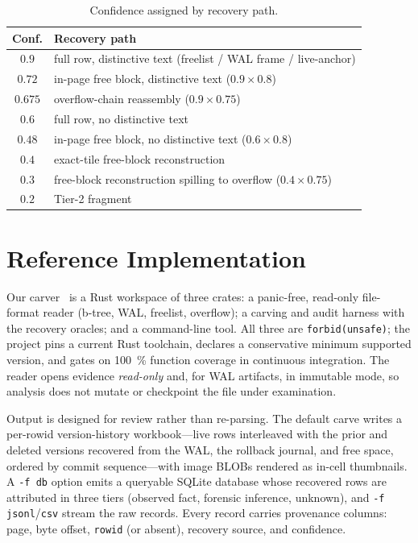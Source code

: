 \documentclass[10pt,a4paper]{article}
\newcommand{\code}[1]{\texttt{#1}}
\newcommand{\Sys}{Our carver}
\newcommand{\Sys}{\texttt{sqlite4n6}}
\begin{document}
\begin{table}[t]
\centering\small
\caption{Confidence assigned by recovery path.}
\label{tab:confidence}
\begin{tabular}{@{}c p{}@{}}
\toprule
Conf. & Recovery path \\
\midrule
$0.9$   & full row, distinctive text (freelist / WAL frame / live-anchor) \\
$0.72$  & in-page free block, distinctive text ($0.9\times0.8$) \\
$0.675$ & overflow-chain reassembly ($0.9\times0.75$) \\
$0.6$   & full row, no distinctive text \\
$0.48$  & in-page free block, no distinctive text ($0.6\times0.8$) \\
$0.4$   & exact-tile free-block reconstruction \\
$0.3$   & free-block reconstruction spilling to overflow ($0.4\times0.75$) \\
$0.2$   & Tier-2 fragment \\
\bottomrule
\end{tabular}
\end{table}

\section{Reference Implementation}\label{sec:impl}

\Sys~\cite{sqlite4n6} is a Rust workspace of three crates: a panic-free, read-only
file-format reader (b-tree, WAL, freelist, overflow); a carving and audit harness
with the recovery oracles; and a command-line tool. All three are
\code{forbid(unsafe)}; the project pins a current Rust toolchain, declares a
conservative minimum supported version, and gates on \SI{100}{\percent} function
coverage in continuous integration. The reader opens evidence \emph{read-only} and,
for WAL artifacts, in immutable mode, so analysis does not mutate or checkpoint the
file under examination.

Output is designed for review rather than re-parsing. The default carve writes a
per-rowid version-history workbook---live rows interleaved with the prior and
deleted versions recovered from the WAL, the rollback journal, and free space,
ordered by commit sequence---with image BLOBs rendered as in-cell thumbnails. A
\code{-f db} option emits a queryable SQLite database whose recovered rows are
attributed in three tiers (observed fact, forensic inference, unknown), and
\code{-f jsonl}/\code{csv} stream the raw records. Every record carries provenance
columns: page, byte offset, \code{rowid} (or absent), recovery source, and
confidence.
\end{document}
